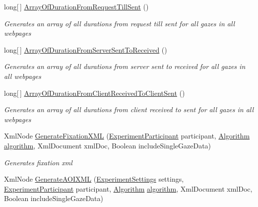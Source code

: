 \begin{DoxyCompactItemize}
long\mbox{[}$\,$\mbox{]} \hyperlink{class_web_analyzer_1_1_models_1_1_data_model_1_1_test_model_ad9e6b0da3998485b11af3f532c429136}{Array\+Of\+Duration\+From\+Request\+Till\+Sent} ()
\begin{DoxyCompactList}\small\item\em Generates an array of all durations from request till sent for all gazes in all webpages \end{DoxyCompactList}\item 
long\mbox{[}$\,$\mbox{]} \hyperlink{class_web_analyzer_1_1_models_1_1_data_model_1_1_test_model_a6e300cf8b7c50571b1f99230d322fb78}{Array\+Of\+Duration\+From\+Server\+Sent\+To\+Received} ()
\begin{DoxyCompactList}\small\item\em Generates an array of all durations from server sent to received for all gazes in all webpages \end{DoxyCompactList}\item 
long\mbox{[}$\,$\mbox{]} \hyperlink{class_web_analyzer_1_1_models_1_1_data_model_1_1_test_model_a2f272e9970feb3a1fbca147b34b8b3f7}{Array\+Of\+Duration\+From\+Client\+Received\+To\+Client\+Sent} ()
\begin{DoxyCompactList}\small\item\em Generates an array of all durations from client received to sent for all gazes in all webpages \end{DoxyCompactList}\item 
Xml\+Node \hyperlink{class_web_analyzer_1_1_models_1_1_data_model_1_1_test_model_a0015bdafb49d512f7b9048d099f11010}{Generate\+Fixation\+X\+M\+L} (\hyperlink{class_web_analyzer_1_1_models_1_1_base_1_1_experiment_participant}{Experiment\+Participant} participant, \hyperlink{class_web_analyzer_1_1_models_1_1_algorithm_model_1_1_algorithm}{Algorithm} \hyperlink{_u_i_2_h_t_m_l_resources_2js_2src_2analyse_8js_a1222cf9678e9ad6a699b071d3308f976}{algorithm}, Xml\+Document xml\+Doc, Boolean include\+Single\+Gaze\+Data)
\begin{DoxyCompactList}\small\item\em Generates fixation xml \end{DoxyCompactList}\item 
Xml\+Node \hyperlink{class_web_analyzer_1_1_models_1_1_data_model_1_1_test_model_addcd4b918203bc9cbe3cd40f2d3713c6}{Generate\+A\+O\+I\+X\+M\+L} (\hyperlink{class_web_analyzer_1_1_models_1_1_settings_model_1_1_experiment_settings}{Experiment\+Settings} settings, \hyperlink{class_web_analyzer_1_1_models_1_1_base_1_1_experiment_participant}{Experiment\+Participant} participant, \hyperlink{class_web_analyzer_1_1_models_1_1_algorithm_model_1_1_algorithm}{Algorithm} \hyperlink{_u_i_2_h_t_m_l_resources_2js_2src_2analyse_8js_a1222cf9678e9ad6a699b071d3308f976}{algorithm}, Xml\+Document xml\+Doc, Boolean include\+Single\+Gaze\+Data)

\end{DoxyCompactItemize}

